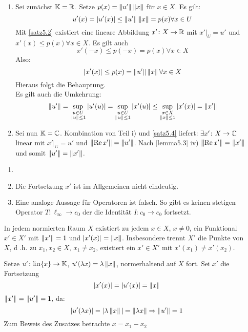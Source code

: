 \begin{beweis}
	\begin{enumerate}
		\item Sei zun\"achst $ \mathbb{K}=\mathbb{R} $. Setze $ p(x)=\left\|u'\right\|\left\|x\right\| $ f\"ur $ x\in X $. Es gilt:
		\[ u'(x)=|u'(x)|\leq\left\|u'\right\|\left\|x\right\|=p(x)\forall x\in U \]
		Mit \ref{satz5.2} existiert eine lineare Abbildung $ x'\colon X\rightarrow\mathbb{R} $ mit $ x'|_U=u' $ und $ x'(x)\leq p(x)\forall x\in X $. Es gilt auch \[ x'(-x)\leq p(-x)=p(x)\forall x\in X  \]
		Also:
		\[ |x'(x)|\leq p(x)=\left\|u'\right\|\left\|x\right\|\forall x\in X \]
		Hieraus folgt die Behauptung.\\
		Es gilt auch die Umkehrung:
		\[ \left\|u'\right\|=\sup_{\substack{u\in U\\\left\|u\right\|\leq 1}}|u'(u)|=\sup_{\substack{u\in U\\\left\|u\right\|\leq 1}}|x'(u)|\leq\sup_{\substack{x\in X\\\left\|x\right\|\leq 1}}|x'(x)|=\left\|x'\right\| \]
		\item Sei nun $ \mathbb{K}=\mathbb{C} $. Kombination von Teil i) und \ref{satz5.4} liefert: $ \exists x'\colon X\rightarrow\mathbb{C} $ linear mit $ x'|_U=u' $ und $ \left\|\operatorname{Re} x'\right\|=\left\|u'\right\| $. Nach \ref{lemma5.3} iv) $ \left\|\operatorname{Re} x'\right\|=\left\|x'\right\| $ und somit $ \left\|u'\right\|=\left\|x'\right\| $.
	\end{enumerate}
\end{beweis}
\begin{bemerkung*}
	\begin{enumerate}
		\item[]
		\item Die Fortsetzung $ x' $ ist im Allgemeinen nicht eindeutig.
		\item Eine analoge Aussage f\"ur Operatoren ist falsch. So gibt es keinen stetigen Operator $ T\colon\ell_\infty\rightarrow c_0 $ der die Identit\"at $ I\colon c_0\rightarrow c_0 $ fortsetzt.
	\end{enumerate}
\end{bemerkung*}
\begin{korollar}
	In jedem normierten Raum $ X $ existiert zu jedem $ x\in X $, $ x\neq 0 $, ein Funktional $ x'\in X' $ mit $ \left\|x'\right\|=1 $ und $ |x'(x)|=\left\|x\right\| $. Insbesondere trennt $ X' $ die Punkte von $ X $, d .h. zu $ x_1,x_2\in X $, $ x_1\neq x_2 $, existiert ein $ x'\in X' $ mit $ x'(x_1)\neq x'(x_2) $. 
\end{korollar}
\begin{beweis}
	Setze $u'\colon \text{lin}\lbrace x\rbrace\rightarrow\mathbb{K} $, $ u'(\lambda x)=\lambda\left\|x\right\| $, normerhaltend auf $ X $ fort. Sei $ x' $ die Fortsetzung
	\[ |x'(x)|=|u'(x)|=\left\|x\right\| \]
	$ \left\|x'\right\|=\left\|u'\right\|=1 $, da:
	\[ |u'(\lambda x)|=|\lambda\left\|x\right\||=\left\|\lambda x\right\|\Rightarrow\left\|u'\right\|=1 \]
	Zum Beweis des Zusatzes betrachte $ x=x_1-x_2 $
\end{beweis}
